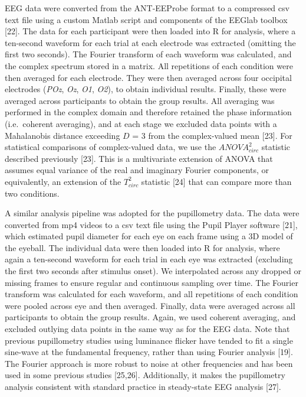 \documentclass[
]{article}
\begin{document}
EEG data were converted from the ANT-EEProbe format to a compressed csv text file using a custom Matlab script and components of the EEGlab toolbox {[}22{]}. The data for each participant were then loaded into R for analysis, where a ten-second waveform for each trial at each electrode was extracted (omitting the first two seconds). The Fourier transform of each waveform was calculated, and the complex spectrum stored in a matrix. All repetitions of each condition were then averaged for each electrode. They were then averaged across four occipital electrodes (\emph{POz}, \emph{Oz}, \emph{O1}, \emph{O2}), to obtain individual results. Finally, these were averaged across participants to obtain the group results. All averaging was performed in the complex domain and therefore retained the phase information (i.e.~coherent averaging), and at each stage we excluded data points with a Mahalanobis distance exceeding \(D\) = 3 from the complex-valued mean {[}23{]}. For statistical comparisons of complex-valued data, we use the \(ANOVA^2_{circ}\) statistic described previously {[}23{]}. This is a multivariate extension of ANOVA that assumes equal variance of the real and imaginary Fourier components, or equivalently, an extension of the \(T^2_{circ}\) statistic {[}24{]} that can compare more than two conditions.

A similar analysis pipeline was adopted for the pupillometry data. The data were converted from mp4 videos to a csv text file using the Pupil Player software {[}21{]}, which estimated pupil diameter for each eye on each frame using a 3D model of the eyeball. The individual data were then loaded into R for analysis, where again a ten-second waveform for each trial in each eye was extracted (excluding the first two seconds after stimulus onset). We interpolated across any dropped or missing frames to ensure regular and continuous sampling over time. The Fourier transform was calculated for each waveform, and all repetitions of each condition were pooled across eye and then averaged. Finally, data were averaged across all participants to obtain the group results. Again, we used coherent averaging, and excluded outlying data points in the same way as for the EEG data. Note that previous pupillometry studies using luminance flicker have tended to fit a single sine-wave at the fundamental frequency, rather than using Fourier analysis {[}19{]}. The Fourier approach is more robust to noise at other frequencies and has been used in some previous studies {[}25,26{]}. Additionally, it makes the pupillometry analysis consistent with standard practice in steady-state EEG analysis {[}27{]}.
\end{document}
